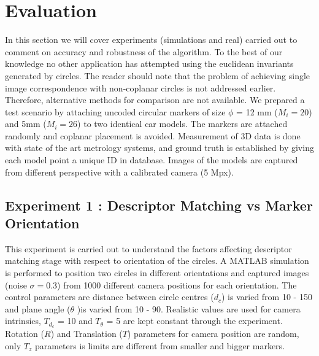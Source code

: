 \documentclass{bmvc2k}
\begin{document}


\section{Evaluation}
In this section we will cover experiments (simulations and real) carried out to comment on accuracy and robustness of the algorithm. To the best of our knowledge no other application has attempted using the euclidean invariants generated by circles. 
The reader should note that the problem of achieving single image correspondence with non-coplanar circles is not addressed earlier. Therefore, alternative methods for comparison are not available. 
We prepared a test scenario by attaching uncoded circular markers of size $ \phi $ = 12 mm ($ M_i = 20 $) and 5mm ($ M_i  = 26$) to two identical car models.  
The markers are attached randomly and coplanar placement is avoided.
Measurement of 3D data is done with state of the art metrology systems, and ground truth is established by giving each model point a unique ID in database. 
Images of the models are captured from different perspective with a calibrated camera (5 Mpx). 

\subsection{Experiment 1 : Descriptor Matching vs Marker Orientation}
This experiment is carried out to understand the factors affecting descriptor matching stage with respect to orientation of the circles.
A MATLAB simulation is performed to position two circles in different orientations and captured images (noise $ \sigma = 0.3 $) from 1000 different camera positions for each orientation.  
The control parameters are distance between circle centres ($ d_c $) is varied from 10 - 150 and plane angle ($ \theta $ )is varied from 10 - 90. Realistic values are used for camera intrinsics, $ T_{d_c} $ = 10 and $ T_\theta $ = 5 are kept constant through the experiment. Rotation ($ R $) and Translation ($ T $) parameters for camera position are random, only $ T_z $ parameters is limits are different from smaller and bigger markers. 
\end{document}
